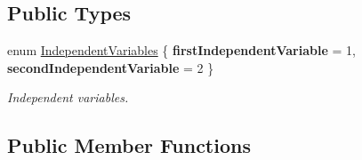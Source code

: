 \subsection*{Public Types}
\begin{DoxyCompactItemize}
\item 
enum \hyperlink{classtudat_1_1geometric__shapes_1_1SingleSurfaceGeometry_a555570aa0102647f40d122b82029fc66}{Independent\+Variables} \{ {\bfseries first\+Independent\+Variable} = 1, 
{\bfseries second\+Independent\+Variable} = 2
 \}\begin{DoxyCompactList}\small\item\em Independent variables. \end{DoxyCompactList}
\end{DoxyCompactItemize}
\subsection*{Public Member Functions}
